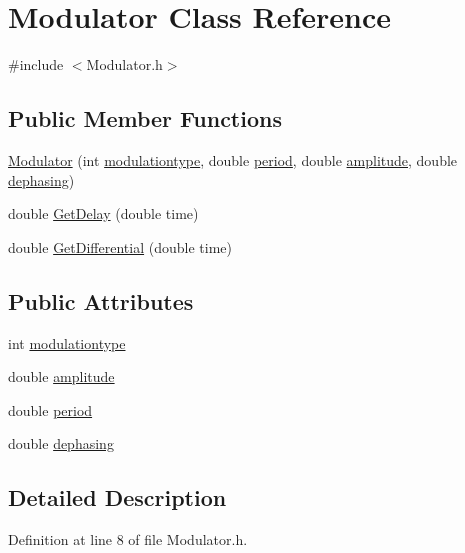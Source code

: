 \hypertarget{classModulator}{
\section{Modulator Class Reference}
\label{classModulator}
}


{\ttfamily \#include $<$Modulator.h$>$}

\subsection*{Public Member Functions}
\begin{DoxyCompactItemize}
\item 
\hyperlink{classModulator_a9988f2b9041384d86b58fd8ff6a2ab30}{Modulator} (int \hyperlink{classModulator_a86625d01ba4ca81cb15fd212c4fa72a8}{modulationtype}, double \hyperlink{classModulator_af9a5cbb6681a9493f97ad0a2104b883f}{period}, double \hyperlink{classModulator_a4c384ef6fe79785c8750710ae2dc5be6}{amplitude}, double \hyperlink{classModulator_aa24a21030bcf630c28a63506e07e3f3a}{dephasing})
\item 
double \hyperlink{classModulator_a10584ade4c8b9e10aaa78a8eed83261b}{GetDelay} (double time)
\item 
double \hyperlink{classModulator_aed0bf37696c14ff9c4231993dfe306dd}{GetDifferential} (double time)
\end{DoxyCompactItemize}
\subsection*{Public Attributes}
\begin{DoxyCompactItemize}
\item 
int \hyperlink{classModulator_a86625d01ba4ca81cb15fd212c4fa72a8}{modulationtype}
\item 
double \hyperlink{classModulator_a4c384ef6fe79785c8750710ae2dc5be6}{amplitude}
\item 
double \hyperlink{classModulator_af9a5cbb6681a9493f97ad0a2104b883f}{period}
\item 
double \hyperlink{classModulator_aa24a21030bcf630c28a63506e07e3f3a}{dephasing}
\end{DoxyCompactItemize}


\subsection{Detailed Description}


Definition at line 8 of file Modulator.h.



